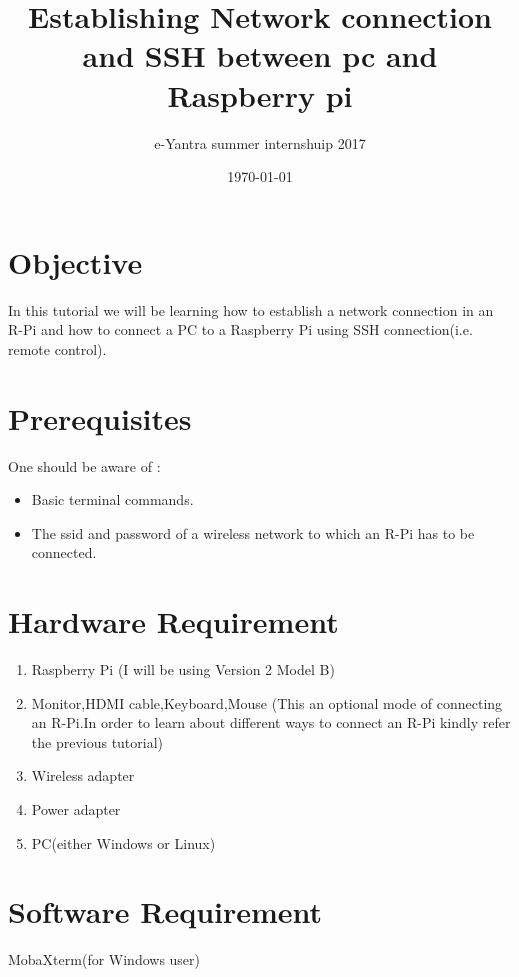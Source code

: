\documentclass[11pt,a4paper]{article}
\title{ Establishing Network connection and SSH between pc and Raspberry pi}
\author{e-Yantra summer internshuip 2017}
\date{\today}
\begin{document}
	\maketitle
	\newpage
	\tableofcontents
	\newpage
	\section{Objective}
	In this tutorial we will be learning how to establish a network connection in an R-Pi and how to connect a PC to a Raspberry Pi using SSH connection(i.e. remote control).
	\section{Prerequisites}
	One should be aware of :
	\begin{itemize}
		\item Basic terminal commands.
		\item The ssid and password of a wireless network to which an R-Pi has to be connected.
	\end{itemize}
	
	\section{Hardware Requirement}
	\begin{enumerate}
		\item Raspberry Pi (I will be using Version 2 Model B)
		\item Monitor,HDMI cable,Keyboard,Mouse (This an optional mode of connecting an R-Pi.In order to learn about different ways to connect an R-Pi kindly refer the previous tutorial)
		\item Wireless adapter
		\item Power adapter
		\item PC(either Windows or Linux)
	\end{enumerate}
		
	\section{Software Requirement}
	MobaXterm(for Windows user)
	
	\newpage
\end{document}
